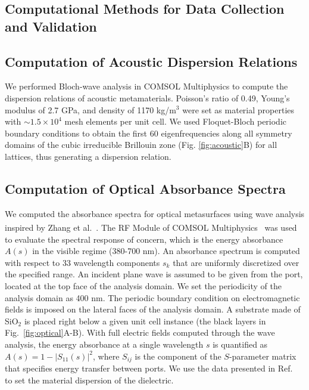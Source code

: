 \documentclass{article}
\begin{document}
\begin{appendices}
\section{Computational Methods for Data Collection and Validation}

\subsection{Computation of Acoustic Dispersion Relations} We performed Bloch-wave analysis in COMSOL Multiphysics to compute the dispersion relations of acoustic metamaterials. Poisson's ratio of 0.49, Young's modulus of 2.7 GPa, and density of 1170 kg/m${^3}$ were set as material properties with $\sim1.5\times10^4$ mesh elements per unit cell. 
We used Floquet-Bloch periodic boundary conditions to obtain the first 60 eigenfrequencies along all symmetry domains of the cubic irreducible Brillouin zone (Fig. \ref{fig:acoustic}B) for all lattices, thus generating a dispersion relation. 

\subsection{Computation of Optical Absorbance Spectra} We computed the absorbance spectra for optical metasurfaces using wave analysis inspired by Zhang et al.~\cite{zhang2023high}. The RF Module of COMSOL Multiphysics\textsuperscript{\textregistered}~\cite{comsol2020} was used to evaluate the spectral response of concern, which is the energy absorbance $A(s)$ in the visible regime (380-700 nm). An absorbance spectrum is computed with respect to 33 wavelength components $s_k$ that are uniformly discretized over the specified range. An incident plane wave is assumed to be given from the port, located at the top face of the analysis domain. We set the periodicity of the analysis domain as 400 nm. The periodic boundary condition on electromagnetic fields is imposed on the lateral faces of the analysis domain. A substrate made of SiO$_2$ is placed right below a given unit cell instance (the black layers in Fig.~\ref{fig:optical}A-B). With full electric fields computed through the wave analysis, the energy absorbance at a single wavelength $s$ is quantified as $A(s)=1-|S_{11}(s)|^2$, where $S_{ij}$ is the component of the $S$-parameter matrix that specifies energy transfer between ports. We use the data presented in Ref.~\cite{aspnes1983dielectric} to set the material dispersion of the dielectric.






\end{appendices}
\end{document}

